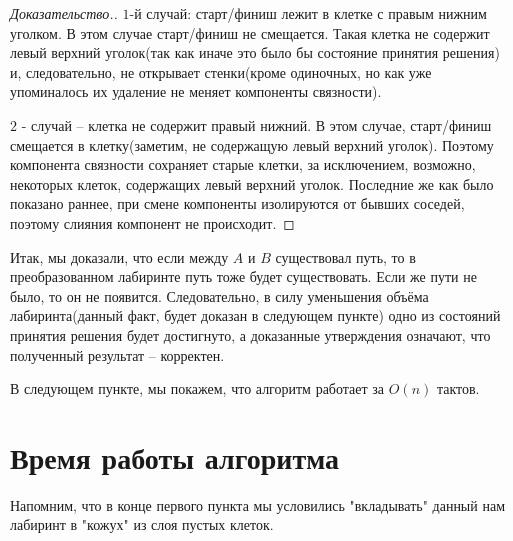\documentclass[12pt]{article}
\begin{document}
\begin{proof}[Доказательство.]
$1$-й случай: старт/финиш лежит в клетке с правым нижним уголком. В этом случае старт/финиш не смещается. Такая клетка не содержит  левый верхний уголок(так как иначе это было бы состояние принятия решения) и, следовательно, не открывает стенки(кроме одиночных, но как уже упоминалось их удаление не меняет компоненты связности). 

$2$ - случай -- клетка не содержит правый нижний. В этом случае, старт/финиш смещается в клетку(заметим, не содержащую левый верхний уголок). Поэтому компонента связности сохраняет старые клетки, за исключением, возможно, некоторых клеток, содержащих левый верхний уголок. Последние же как было показано раннее, при смене компоненты изолируются от бывших соседей, поэтому слияния компонент не происходит.
\end{proof}

Итак, мы доказали, что если между $A$ и $B$ существовал путь, то в преобразованном лабиринте путь тоже будет существовать. Если же пути не было, то он не появится. Следовательно, в силу уменьшения объёма лабиринта(данный факт, будет доказан в следующем пункте) одно из состояний принятия решения будет достигнуто, а доказанные утверждения означают, что полученный результат -- корректен.

В следующем пункте, мы покажем, что алгоритм работает за $O(n)$ тактов.

\section*{Время работы алгоритма}

Напомним, что в конце первого пункта мы условились "вкладывать" данный нам лабиринт в "кожух" из слоя пустых клеток.
\end{document}
